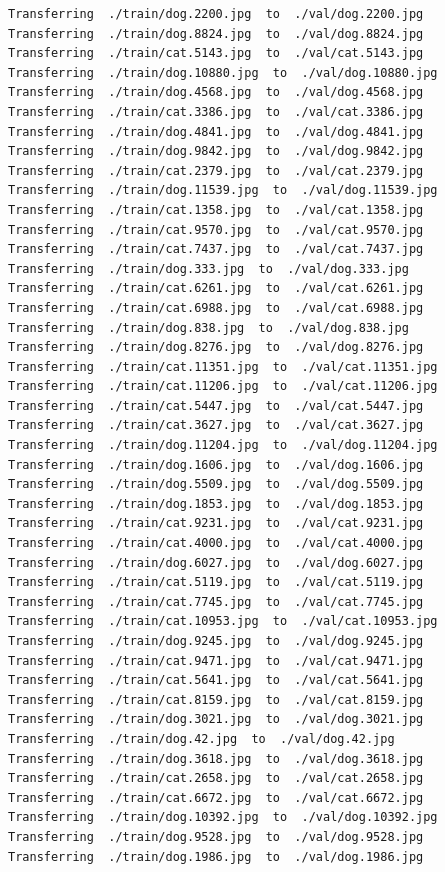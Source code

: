 \documentclass[]{book}
\theoremstyle{definition}
\theoremstyle{definition}
\theoremstyle{definition}
\theoremstyle{remark}
\begin{document}
\begin{verbatim}
Transferring  ./train/dog.2200.jpg  to  ./val/dog.2200.jpg
Transferring  ./train/dog.8824.jpg  to  ./val/dog.8824.jpg
Transferring  ./train/cat.5143.jpg  to  ./val/cat.5143.jpg
Transferring  ./train/dog.10880.jpg  to  ./val/dog.10880.jpg
Transferring  ./train/dog.4568.jpg  to  ./val/dog.4568.jpg
Transferring  ./train/cat.3386.jpg  to  ./val/cat.3386.jpg
Transferring  ./train/dog.4841.jpg  to  ./val/dog.4841.jpg
Transferring  ./train/dog.9842.jpg  to  ./val/dog.9842.jpg
Transferring  ./train/cat.2379.jpg  to  ./val/cat.2379.jpg
Transferring  ./train/dog.11539.jpg  to  ./val/dog.11539.jpg
Transferring  ./train/cat.1358.jpg  to  ./val/cat.1358.jpg
Transferring  ./train/cat.9570.jpg  to  ./val/cat.9570.jpg
Transferring  ./train/cat.7437.jpg  to  ./val/cat.7437.jpg
Transferring  ./train/dog.333.jpg  to  ./val/dog.333.jpg
Transferring  ./train/cat.6261.jpg  to  ./val/cat.6261.jpg
Transferring  ./train/cat.6988.jpg  to  ./val/cat.6988.jpg
Transferring  ./train/dog.838.jpg  to  ./val/dog.838.jpg
Transferring  ./train/dog.8276.jpg  to  ./val/dog.8276.jpg
Transferring  ./train/cat.11351.jpg  to  ./val/cat.11351.jpg
Transferring  ./train/cat.11206.jpg  to  ./val/cat.11206.jpg
Transferring  ./train/cat.5447.jpg  to  ./val/cat.5447.jpg
Transferring  ./train/cat.3627.jpg  to  ./val/cat.3627.jpg
Transferring  ./train/dog.11204.jpg  to  ./val/dog.11204.jpg
Transferring  ./train/dog.1606.jpg  to  ./val/dog.1606.jpg
Transferring  ./train/dog.5509.jpg  to  ./val/dog.5509.jpg
Transferring  ./train/dog.1853.jpg  to  ./val/dog.1853.jpg
Transferring  ./train/cat.9231.jpg  to  ./val/cat.9231.jpg
Transferring  ./train/cat.4000.jpg  to  ./val/cat.4000.jpg
Transferring  ./train/dog.6027.jpg  to  ./val/dog.6027.jpg
Transferring  ./train/cat.5119.jpg  to  ./val/cat.5119.jpg
Transferring  ./train/cat.7745.jpg  to  ./val/cat.7745.jpg
Transferring  ./train/cat.10953.jpg  to  ./val/cat.10953.jpg
Transferring  ./train/dog.9245.jpg  to  ./val/dog.9245.jpg
Transferring  ./train/cat.9471.jpg  to  ./val/cat.9471.jpg
Transferring  ./train/cat.5641.jpg  to  ./val/cat.5641.jpg
Transferring  ./train/cat.8159.jpg  to  ./val/cat.8159.jpg
Transferring  ./train/dog.3021.jpg  to  ./val/dog.3021.jpg
Transferring  ./train/dog.42.jpg  to  ./val/dog.42.jpg
Transferring  ./train/dog.3618.jpg  to  ./val/dog.3618.jpg
Transferring  ./train/cat.2658.jpg  to  ./val/cat.2658.jpg
Transferring  ./train/cat.6672.jpg  to  ./val/cat.6672.jpg
Transferring  ./train/dog.10392.jpg  to  ./val/dog.10392.jpg
Transferring  ./train/dog.9528.jpg  to  ./val/dog.9528.jpg
Transferring  ./train/dog.1986.jpg  to  ./val/dog.1986.jpg

\end{verbatim}
\end{document}
